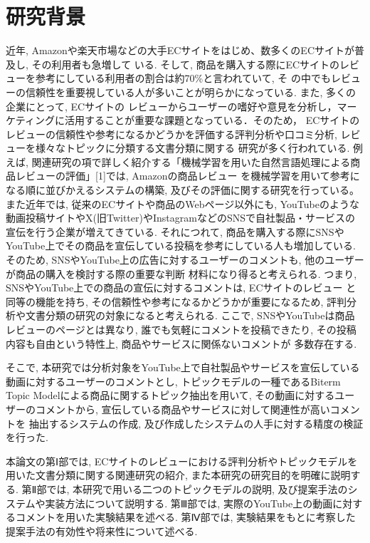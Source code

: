 \documentclass{ltjarticle}
\begin{document}
\section{研究背景}
近年, Amazonや楽天市場などの大手ECサイトをはじめ、数多くのECサイトが普及し,  その利用者も急増して
いる. そして, 商品を購入する際にECサイトのレビューを参考にしている利用者の割合は約70\%と言われていて, そ
の中でもレビューの信頼性を重要視している人が多いことが明らかになっている. また, 多くの企業にとって, ECサイトの
レビューからユーザーの嗜好や意見を分析し，マーケティングに活用することが重要な課題となっている．そのため，
ECサイトのレビューの信頼性や参考になるかどうかを評価する評判分析や口コミ分析, レビューを様々なトピックに分類する文書分類に関する
研究が多く行われている. 例えば, 関連研究の項で詳しく紹介する「機械学習を用いた自然言語処理による商品レビューの評価」[1]では, Amazonの商品レビュー
を機械学習を用いて参考になる順に並びかえるシステムの構築, 及びその評価に関する研究を行っている。
また近年では, 従来のECサイトや商品のWebページ以外にも, YouTubeのような
動画投稿サイトやX(旧Twitter)やInstagramなどのSNSで自社製品・サービスの宣伝を行う企業が増えてきている. 
それにつれて, 商品を購入する際にSNSやYouTube上でその商品を宣伝している投稿を参考にしている人も増加している. 
そのため, SNSやYouTube上の広告に対するユーザーのコメントも, 他のユーザーが商品の購入を検討する際の重要な判断
材料になり得ると考えられる. つまり, SNSやYouTube上での商品の宣伝に対するコメントは, ECサイトのレビュー
と同等の機能を持ち, その信頼性や参考になるかどうかが重要になるため, 
評判分析や文書分類の研究の対象になると考えられる. ここで, SNSやYouTubeは商品レビューのページとは異なり, 
誰でも気軽にコメントを投稿できたり, その投稿内容も自由という特性上, 商品やサービスに関係ないコメントが
多数存在する.

そこで, 本研究では分析対象をYouTube上で自社製品やサービスを宣伝している動画に対するユーザーのコメントとし, 
トピックモデルの一種であるBiterm Topic Modelによる商品に関するトピック抽出を用いて, 
その動画に対するユーザーのコメントから, 宣伝している商品やサービスに対して関連性が高いコメントを
抽出するシステムの作成, 及び作成したシステムの人手に対する精度の検証を行った. 

本論文の第Ⅰ部では, ECサイトのレビューにおける評判分析やトピックモデルを用いた文書分類に関する関連研究の紹介, 
また本研究の研究目的を明確に説明する.
第Ⅱ部では, 本研究で用いる二つのトピックモデルの説明, 及び提案手法のシステムや実装方法について説明する.
第Ⅲ部では, 実際のYouTube上の動画に対するコメントを用いた実験結果を述べる.
第Ⅳ部では, 実験結果をもとに考察した提案手法の有効性や将来性について述べる. 
\end{document}
